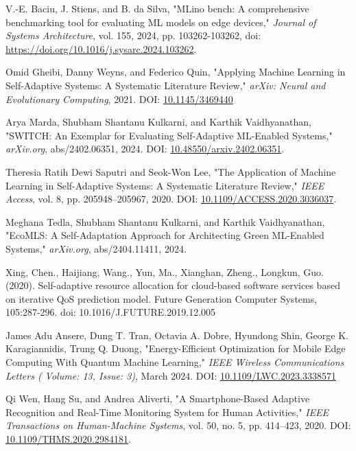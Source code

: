 \begin{thebibliography}{00}

V.-E. Baciu, J. Stiens, and B. da Silva, "MLino bench: A comprehensive benchmarking tool for evaluating ML models on edge devices," \textit{Journal of Systems Architecture}, vol. 155, 2024, pp. 103262-103262, doi: 
\href{https://doi.org/10.1016/j.sysarc.2024.103262}{https://doi.org/10.1016/j.sysarc.2024.103262}.

Omid Gheibi, Danny Weyns, and Federico Quin,
"Applying Machine Learning in Self-Adaptive Systems: A Systematic Literature Review,"
\textit{arXiv: Neural and Evolutionary Computing}, 2021.
DOI: \href{https://doi.org/10.1145/3469440}{10.1145/3469440}

Arya Marda, Shubham Shantanu Kulkarni, and Karthik Vaidhyanathan,
"SWITCH: An Exemplar for Evaluating Self-Adaptive ML-Enabled Systems,"
\textit{arXiv.org}, abs/2402.06351, 2024.
DOI: \href{https://doi.org/10.48550/arxiv.2402.06351}{10.48550/arxiv.2402.06351}.

Theresia Ratih Dewi Saputri and Seok-Won Lee,
"The Application of Machine Learning in Self-Adaptive Systems: A Systematic Literature Review,"
\textit{IEEE Access}, vol. 8, pp. 205948--205967, 2020.
DOI: \href{https://doi.org/10.1109/ACCESS.2020.3036037}{10.1109/ACCESS.2020.3036037}.

Meghana Tedla, Shubham Shantanu Kulkarni, and Karthik Vaidhyanathan,
"EcoMLS: A Self-Adaptation Approach for Architecting Green ML-Enabled Systems,"
\textit{arXiv.org}, abs/2404.11411, 2024.

Xing, Chen., Haijiang, Wang., Yun, Ma., Xianghan, Zheng., Longkun, Guo. (2020). Self-adaptive resource allocation for cloud-based software services based on iterative QoS prediction model. Future Generation Computer Systems, 105:287-296. doi: 10.1016/J.FUTURE.2019.12.005

James Adu Ansere, Dung T. Tran, Octavia A. Dobre, Hyundong Shin, George K. Karagiannidis, Trung Q. Duong,
"Energy-Efficient Optimization for Mobile Edge Computing With Quantum Machine Learning,"
\textit{IEEE Wireless Communications Letters ( Volume: 13, Issue: 3)}, March 2024.
DOI: \href{https://doi.org/10.1109/LWC.2023.3338571}{10.1109/LWC.2023.3338571}

Qi Wen, Hang Su, and Andrea Aliverti,
"A Smartphone-Based Adaptive Recognition and Real-Time Monitoring System for Human Activities,"
\textit{IEEE Transactions on Human-Machine Systems}, vol. 50, no. 5, pp. 414--423, 2020.
DOI: \href{https://doi.org/10.1109/THMS.2020.2984181}{10.1109/THMS.2020.2984181}.


\end{thebibliography}
